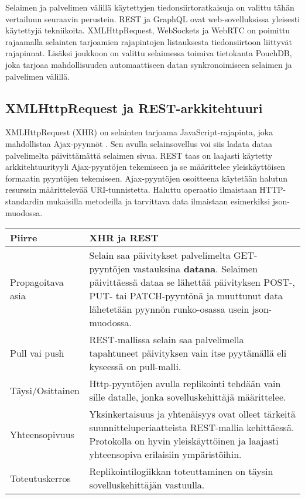 \documentclass[finnish,twoside,censored,csm,sw-track-2018]{HYthesisML}
\begin{document}
Selaimen ja palvelimen välillä käytettyjen tiedonsiirtoratkaisuja on valittu tähän vertailuun seuraavin perustein. REST ja GraphQL ovat web-sovelluksissa yleisesti käytettyjä tekniikoita. XMLHttpRequest, WebSockets ja WebRTC on poimittu rajaamalla selainten tarjoamien rajapintojen \citep{web-apis} listauksesta tiedonsiirtoon liittyvät rajapinnat. Lisäksi joukkoon on valittu selaimessa toimiva tietokanta PouchDB, joka tarjoaa mahdollisuuden automaattiseen datan synkronoimiseen selaimen ja palvelimen välillä.

\subsection{XMLHttpRequest ja REST-arkkitehtuuri}

XMLHttpRequest (XHR) on selainten tarjoama JavaScript-rajapinta, joka mahdollistaa Ajax-pyynnöt \cite{xhr}. Sen avulla selainsovellus voi siis ladata dataa palvelimelta päivittämättä selaimen sivua. REST taas on laajasti käytetty arkkitehtuurityyli Ajax-pyyntöjen tekemiseen ja se määrittelee yleiskäyttöisen formaatin pyyntöjen tekemiseen. Ajax-pyyntöjen osoitteena käytetään halutun resurssin määrittelevää URI-tunnistetta. Haluttu operaatio ilmaistaan HTTP-standardin mukaisilla metodeilla ja tarvittava data ilmaistaan esimerkiksi json-muodossa.

\begin{center}
\begin{tabular}{ | m{3.3cm} | m{11.7cm} | }
 \hline
 \textbf{Piirre} & \textbf{XHR ja REST}\\ 
 \hline
 Propagoitava asia & Selain saa päivitykset palvelimelta GET-pyyntöjen vastauksina \textbf{datana}. Selaimen päivittäessä dataa se lähettää päivityksen POST-, PUT- tai PATCH-pyyntönä ja muuttunut data lähetetään pyynnön runko-osassa usein json-muodossa. \\
 \hline
 Pull vai push & REST-mallissa selain saa palvelimella tapahtuneet päivityksen vain itse pyytämällä eli kyseessä on pull-malli.\\
 \hline
 Täysi/Osittainen & Http-pyyntöjen avulla replikointi tehdään vain sille datalle, jonka sovelluskehittäjä määrittelee. \\
 \hline
 Yhteensopivuus & Yksinkertaisuus ja yhtenäisyys ovat olleet tärkeitä suunnitteluperiaatteista REST-mallia kehittäessä. Protokolla on hyvin yleiskäyttöinen ja laajasti yhteensopiva erilaisiin ympäristöihin.\\
 \hline
 Toteutuskerros & Replikointilogiikkan toteuttaminen on täysin sovelluskehittäjän vastuulla. \\
 \hline
\end{tabular}
\end{center}
\end{document}
